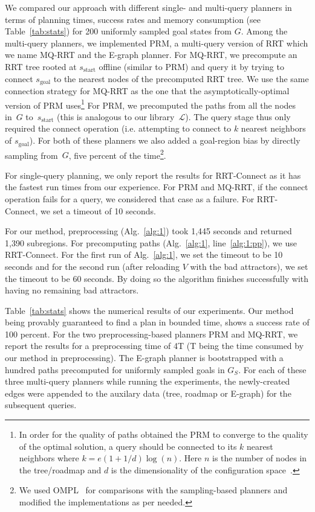 \documentclass[letterpaper]{article} %
\newcommand{\calL}{\ensuremath{\mathcal{L}}\xspace}
\newcommand{\sStart}{\ensuremath{s_{\text{start}}\xspace}}
\newcommand{\sGoal}{\ensuremath{s_{\text{goal}}\xspace}}
\begin{document}
We compared our approach with different single- and multi-query planners in terms of planning times, success rates and memory consumption (see Table~\ref{tab:stats}) for 200 uniformly sampled goal states from $G$. Among the multi-query planners, we implemented \textsf{PRM}, a multi-query version of \textsf{RRT} which we name \textsf{MQ-RRT} and the \textsf{E-graph} planner. 
For \textsf{MQ-RRT}, we precompute an \textsf{RRT} tree rooted at  $\sStart$ offline (similar to \textsf{PRM}) and query it by trying to connect $\sGoal$ to the nearest nodes of the precomputed RRT tree. We use the same connection strategy for \textsf{MQ-RRT} as the one that the asymptotically-optimal version of \textsf{PRM} uses\footnote{In order for the quality of paths obtained the \textsf{PRM} to converge to the quality of the optimal solution, a query should be connected to its $k$ nearest neighbors where 
$k = e(1+1/d)\log(n)$.
Here $n$ is the number of nodes in the tree/roadmap and $d$ is the dimensionality of the configuration space~\cite{karaman2011sampling,SSH16}. 
}
For \textsf{PRM}, we precomputed the paths from all the nodes in~$G$ to~$s_{\text{start}}$ (this is analogous to our library~$\calL$). 
The query stage thus only required the connect operation (i.e. attempting to connect to $k$ nearest neighbors of $\sGoal$). For both of these planners we also added a goal-region bias by directly sampling from~$G$, five percent of the time\footnote{We used OMPL~\cite{SMK12} for comparisons with the sampling-based planners and modified the implementations as per needed.}. 

For single-query planning, we only report the results for \textsf{RRT-Connect} as it has the fastest run times from our experience. For \textsf{PRM} and \textsf{MQ-RRT}, if the connect operation fails for a query, we considered that case as a failure. For \textsf{RRT-Connect}, we set a timeout of 10 seconds.

For our method, preprocessing (Alg.~\ref{alg:1}) took 1,445 seconds and returned 1,390 subregions. For precomputing paths (Alg.~\ref{alg:1}, line~\ref{alg:1:pp}), we use \textsf{RRT-Connect}. For the first run of Alg.~\ref{alg:1}, we set the timeout to be 10 seconds and for the second run (after reloading $V$ with the bad attractors), we set the timeout to be 60 seconds. By doing so the algorithm finishes successfully with having no remaining bad attractors.

Table~\ref{tab:stats} shows the numerical results of our experiments. Our method being provably guaranteed to find a plan in bounded time, shows a success rate of 100 percent. For the two preprocessing-based planners \textsf{PRM} and \textsf{MQ-RRT}, we report the results for a preprocessing time of 4T (T being the time consumed by our method in preprocessing). The \textsf{E-graph} planner is bootstrapped with a hundred paths precomputed for uniformly sampled goals in $G_S$. For each of these three multi-query planners while running the experiments, the newly-created edges were appended to the auxilary data (tree, roadmap or \textsf{E-graph}) for the subsequent queries.
\end{document}
